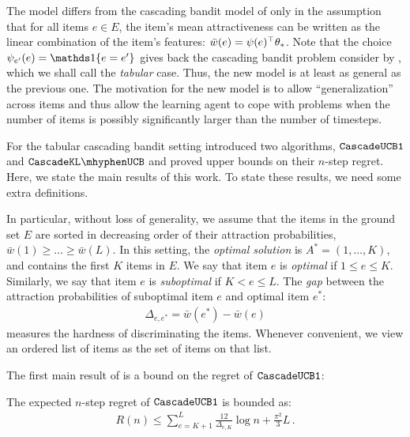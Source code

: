 The model differs from the cascading bandit model of \citet{kveton15cascade} only in the assumption that for all items $e\in E$, the item's mean attractiveness can be written as the linear combination of the item's features:
$\bar{w}(e) = \psi(e)^\top \theta_*$.
Note that the choice $\psi_{e'}(e) = \one{e=e'}$ gives back the cascading bandit problem consider by \cite{kveton15cascade}, which we shall call the \emph{tabular} case.
Thus, the new model is at least as general as the previous one.
The motivation for the new model is to allow ``generalization'' across items and thus allow the learning agent to cope with problems when the number of items is possibly significantly larger than the number of timesteps.

For the tabular cascading bandit setting \citet{kveton15cascade} introduced two algorithms,  ${\tt CascadeUCB1}$ and $\cascadeklucb$
and proved upper bounds on their $n$-step regret.
Here, we state the main results of this work.
To state these results, we need some extra definitions.

In particular, without loss of generality, we assume that the items in the ground set $E$
 are sorted in decreasing order of their attraction probabilities, $\bar{w}(1) \geq \ldots \geq \bar{w}(L)$. In this setting, the \emph{optimal solution} is $A^\ast = (1, \dots, K)$, and contains the first $K$ items in $E$. We say that item $e$ is \emph{optimal} if $1 \leq e \leq K$. Similarly, we say that item $e$ is \emph{suboptimal} if $K < e \leq L$. The \emph{gap} between the attraction probabilities of suboptimal item $e$ and optimal item $e^\ast$:
\begin{align}
  \Delta_{e, e^\ast} = \bar{w}(e^\ast) - \bar{w}(e)
  \label{eq:gap}
\end{align}
measures the hardness of discriminating the items. Whenever convenient, we view an ordered list of items as the set of items on that list.

The first main result of  \citet{kveton15cascade} is a bound on the regret of ${\tt CascadeUCB1}$:
\begin{theorem}
\label{thm:ucb1} The expected $n$-step regret of ${\tt CascadeUCB1}$ is bounded as:
\begin{align*}
  R(n) \leq
  \sum_{e = K + 1}^L \frac{12}{\Delta_{e, K}} \log n + \frac{\pi^2}{3} L\,.
\end{align*}
\end{theorem}

